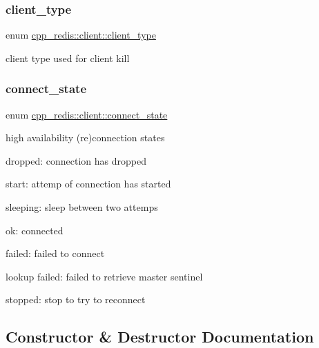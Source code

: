 \subsubsection{\texorpdfstring{client\+\_\+type}{client\_type}}
{\footnotesize\ttfamily enum \hyperlink{classcpp__redis_1_1client_a388877b01b4e045cddb138e70a68e000}{cpp\+\_\+redis\+::client\+::client\+\_\+type}\hspace{0.3cm}{\ttfamily [strong]}}

client type used for client kill \mbox{\label{classcpp__redis_1_1client_a2512bd48dd45391249a69bd720c1e4da}} 
\subsubsection{\texorpdfstring{connect\+\_\+state}{connect\_state}}
{\footnotesize\ttfamily enum \hyperlink{classcpp__redis_1_1client_a2512bd48dd45391249a69bd720c1e4da}{cpp\+\_\+redis\+::client\+::connect\+\_\+state}\hspace{0.3cm}{\ttfamily [strong]}}

high availability (re)connection states
\begin{DoxyItemize}
\item dropped\+: connection has dropped
\item start\+: attemp of connection has started
\item sleeping\+: sleep between two attemps
\item ok\+: connected
\item failed\+: failed to connect
\item lookup failed\+: failed to retrieve master sentinel
\item stopped\+: stop to try to reconnect 
\end{DoxyItemize}

\subsection{Constructor \& Destructor Documentation}
\mbox{\label{classcpp__redis_1_1client_ae879c3a6829a2da9d03f80c1ec4b8d9b}} 
